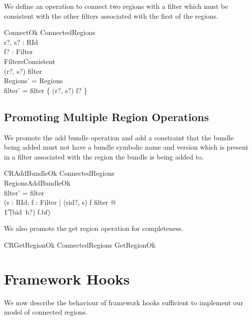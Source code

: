 \documentclass[a4paper,9pt]{article}
\begin{document}
We define an operation to connect two regions with a filter which must be consistent with
the other filters associated with the first of the regions.
\begin{schema}{ConnectOk}
  \Delta ConnectedRegions \\
  r?, s? : RId \\
  f? : Filter \\
  FiltersConsistent \\
\where
  (r?, s?) \notin \dom filter \\
  \theta Regions' = \theta Regions \\
  filter' = filter \cup \{ (r?, s?) \mapsto f? \} \\
\end{schema}

\subsection{Promoting Multiple Region Operations}

We promote the add bundle operation and add a constraint that the bundle being added must not 
have a bundle symbolic name and version which is present in a filter associated with the region
the bundle is being added to.
\begin{schema}{CRAddBundleOk}
  \Delta ConnectedRegions \\
  RegionsAddBundleOk \\
\where
  filter' = filter \\
  (\forall s : RId; f : Filter | (rid?, s) \mapsto f \in filter @ \\
\t1 (bid~b?) \notin f.bf) \\ 
\end{schema}

We also promote the get region operation for completeness.
\begin{zed}
  CRGetRegionOk  \Xi ConnectedRegions \land GetRegionOk \\
\end{zed}

\clearpage
\section{Framework Hooks}
\label{cha:fhooks}

We now describe the behaviour of framework hooks sufficient to implement our model
of connected regions.
\end{document}
